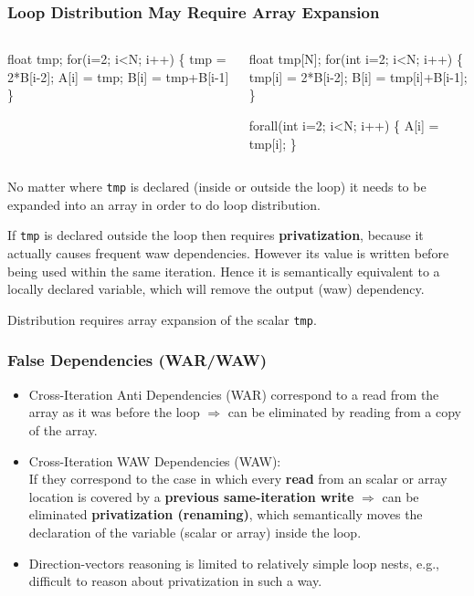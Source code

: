 \documentclass{beamer}
\renewcommand{\emph}[1]{\textcolor{structure}{#1}}
\newcommand{\emp}[1]{\textcolor{DikuRed}{ #1}}
\begin{document}
\begin{frame}[fragile,t]
  \frametitle{Loop Distribution May Require Array Expansion} 


\begin{columns}
\begin{colorcode}[fontsize=\scriptsize]
  float tmp;
  for(i=2; i<N; i++) \{
    \emp{tmp} = 2*B[i-2]; 
    A[i] = tmp;
    B[i] = tmp+B[i-1]
  \}
\end{colorcode}
\begin{colorcode}[fontsize=\scriptsize]
  \emph{float tmp[N]};
  for(int i=2; i<N; i++) \{
    tmp[i] = 2*B[i-2]; 
    B[i] = tmp[i]+B[i-1];
  \}

  \emph{forall(int i=2; i<N; i++)} \{
    A[i] = tmp[i];
  \}
\end{colorcode}
\end{columns}
\bigskip

No matter where {\tt tmp} is declared (inside or outside
the loop) it needs to be expanded into an array in order
to do loop distribution.\bigskip

If {\tt tmp} is declared outside the loop then requires \emp{\bf privatization}, \pause
because it actually causes frequent {\sc waw} dependencies.
However its value is written before being used within the same iteration.
Hence it is semantically equivalent to a locally declared variable,
which will remove the output ({\sc waw}) dependency.\bigskip

Distribution requires array expansion of the scalar {\tt tmp}.

\end{frame}


\begin{frame}[fragile,t]
  \frametitle{False Dependencies (WAR/WAW)} 

\begin{itemize}
    \item \emp{Cross-Iteration Anti Dependencies (WAR)} 
        correspond to a read from the array as it was 
        before the loop $\Rightarrow$ can be eliminated
        by reading from a copy of the array.\bigskip

    \item \emp{Cross-Iteration WAW Dependencies (WAW)}:\\
        If they correspond to the case in which every \emp{\bf read} from
        an scalar or array location is covered by a \emp{\bf previous same-iteration write}
        $\Rightarrow$ can be eliminated \emph{\bf privatization (renaming)},
        which semantically moves the declaration of the variable (scalar or array) 
        inside the loop.\bigskip

    \item Direction-vectors reasoning is limited to relatively
        simple loop nests, e.g., difficult to reason about 
        privatization in such a way.
\end  {itemize}
\end{frame}
\end{document}
